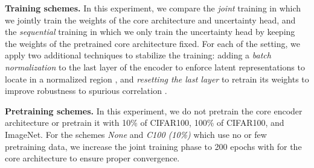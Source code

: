 \textbf{Training schemes.} In this experiment, we compare the \textit{joint} training in which we jointly train the weights of the core architecture and uncertainty head, and the \textit{sequential} training in which we only train the uncertainty head by keeping the weights of the pretrained core architecture fixed. For each of the setting, we apply two additional techniques to stabilize the training: adding a \textit{batch normalization} to the last layer of the encoder to enforce latent representations to locate in a normalized region \citep{ioffe2015bn,NatPN2021}, and \textit{resetting the last layer} to retrain its weights to improve robustness to spurious correlation \citep{kirichenko2022reset}.

\textbf{Pretraining schemes.} In this experiment, we do not pretrain the core encoder architecture or pretrain it with 10\% of CIFAR100, 100\% of CIFAR100, and ImageNet. For the schemes \textit{None} and \textit{C100 (10\%)} which use no or few pretraining data, we increase the joint training phase to 200 epochs with for the core architecture to ensure proper convergence.



